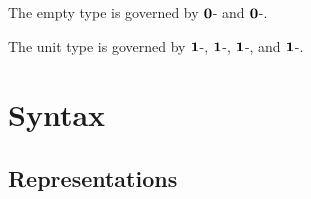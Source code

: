 \documentclass[UKenglish, 11pt, a4paper, parskip=half]{scrbook}
\newcommand{\inlinecode}[1]{\lstinline{#1}}
\begin{document}
The empty type is governed by \( \mathbf{0} \)-\rform{} and \( \mathbf{0} \)-\relim.

The unit type is governed by \( \mathbf{1} \)-\rform, \( \mathbf{1} \)-\rintro, \( \mathbf{1} \)-\relim, and \( \mathbf{1} \)-\rcomp.
\fi{}

\chapter{Syntax}

\iffalse{}
\section{Conventions regarding S-expressions and Feather expressions}

\subsection{Typing}

Previously, we have created types of S-expressions for Feather's syntax.
For example, \inlinecode{(const false)} has type \inlinecode{Expr}.
There is a need to distinguish between the type of an S-expression and the type of the Feather expression it represents.
These two type systems are logically distinct; the existence of an S-expression type does not imply the existence of a corresponding Feather type, or vice versa.

We define \( \mathcal T(e) \) to be the Feather type of an S-expression \( e : \) \inlinecode{Expr}.

Unless otherwise stated, all types in all following sections refer to the Feather type system, so \( x : \tau \) should be interpreted as the judgment `\( x \) is a Feather expression with type \( \tau \)'.
Further, the word `expression' should be taken to mean `Feather expression'.

\subsection{De Bruijn indices}

While de Bruijn indices are useful when processing Feather algorithmically, they are inconvenient to use when discussing the language at a higher level.
To this end, from now on unless otherwise stated, constructs using a de Bruijn index will instead be written as if they use a named variable.
Likewise, binding expressions will be written as if they bind their variables to names.
\fi{}

\section{Representations}
\end{document}
